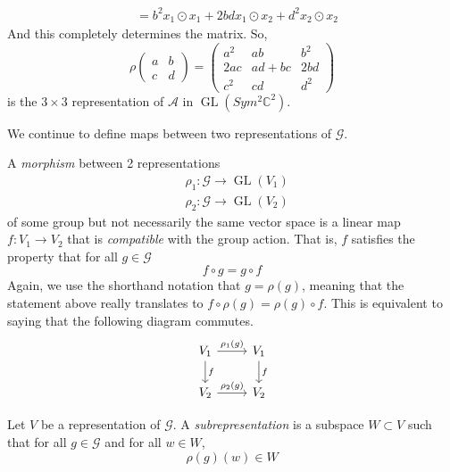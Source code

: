 \documentclass{article}
\DeclareMathOperator{\GL}{GL}
\begin{document}
\begin{example}
\begin{align*}
      & = b^2 x_1 \odot x_1 + 2bd x_1 \odot x_2 + d^2 x_2 \odot x_2
    \end{align*}
    And this completely determines the matrix. So, 
    \begin{equation}
      \rho \begin{pmatrix}
      a&b\\c&d
      \end{pmatrix} = \begin{pmatrix}
      a^2&ab&b^2\\2ac&ad+bc&2bd\\c^2&cd&d^2
      \end{pmatrix}
    \end{equation}
    is the $3 \times 3$ representation of $\mathcal{A}$ in $\GL(Sym^2 \mathbb{C}^2)$. 
  \end{example}

  We continue to define maps between two representations of $\mathcal{G}$. 

  \begin{definition}
    A \textit{morphism} between 2 representations 
    \begin{align*}
      & \rho_1: \mathcal{G} \longrightarrow \GL(V_1) \\
      & \rho_2: \mathcal{G} \longrightarrow \GL(V_2) 
    \end{align*}
    of some group but not necessarily the same vector space is a linear map $f: V_1 \longrightarrow V_2$ that is \textit{compatible} with the group action. That is, $f$ satisfies the property that for all $g \in \mathcal{G}$
    \begin{equation}
      f \circ g = g \circ f
    \end{equation}
    Again, we use the shorthand notation that $g = \rho(g)$, meaning that the statement above really translates to $ f \circ \rho(g) = \rho(g) \circ f$. This is equivalent to saying that the following diagram commutes. 
    \[\begin{tikzcd}
    V_1 \arrow{r}{\rho_1(g)} \arrow{d}{f} & V_1 \arrow{d}{f} \\
    V_2 \arrow{r}{\rho_2 (g)} & V_2
    \end{tikzcd}\]
  \end{definition}

  \begin{definition}
    Let $V$ be a representation of $\mathcal{G}$. A \textit{subrepresentation} is a subspace $W \subset V$ such that for all $g \in \mathcal{G}$ and for all $w \in W$, 
    \begin{equation}
      \rho(g)(w) \in W
    \end{equation}
  \end{definition}
\end{document}
